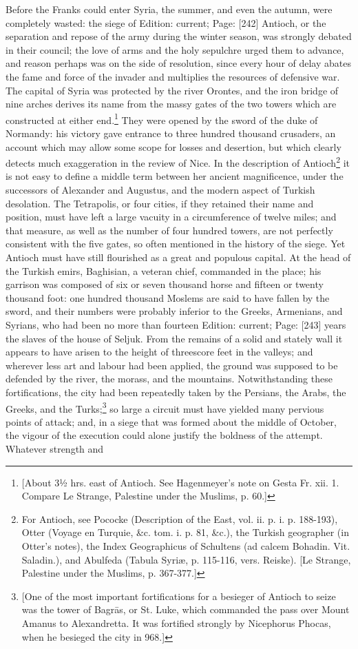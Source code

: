 Before the Franks could enter Syria, the summer, and even the autumn, were completely wasted: the siege of Edition: current; Page: [242] Antioch, or the separation and repose of the army during the winter season, was strongly debated in their council; the love of arms and the holy sepulchre urged them to advance, and reason perhaps was on the side of resolution, since every hour of delay abates the fame and force of the invader and multiplies the resources of defensive war. The capital of Syria was protected by the river Orontes, and the iron bridge of nine arches derives its name from the massy gates of the two towers which are constructed at either end.\footnote{[About 3½ hrs. east of Antioch. See Hagenmeyer\texthebrew{}’s note on Gesta Fr. xii. 1. Compare Le Strange, Palestine under the Muslims, p. 60.]} They were opened by the sword of the duke of Normandy: his victory gave entrance to three hundred thousand crusaders, an account which may allow some scope for losses and desertion, but which clearly detects much exaggeration in the review of Nice. In the description of Antioch\footnote{For Antioch, see Pococke (Description of the East, vol. ii. p. i. p. 188-193), Otter (Voyage en Turquie, \&c. tom. i. p. 81, \&c.), the Turkish geographer (in Otter\texthebrew{}’s notes), the Index Geographicus of Schultens (ad calcem Bohadin. Vit. Saladin.), and Abulfeda (Tabula Syriæ, p. 115-116, vers. Reiske). [Le Strange, Palestine under the Muslims, p. 367-377.]} it is not easy to define a middle term between her ancient magnificence, under the successors of Alexander and Augustus, and the modern aspect of Turkish desolation. The Tetrapolis, or four cities, if they retained their name and position, must have left a large vacuity in a circumference of twelve miles; and that measure, as well as the number of four hundred towers, are not perfectly consistent with the five gates, so often mentioned in the history of the siege. Yet Antioch must have still flourished as a great and populous capital. At the head of the Turkish emirs, Baghisian, a veteran chief, commanded in the place; his garrison was composed of six or seven thousand horse and fifteen or twenty thousand foot: one hundred thousand Moslems are said to have fallen by the sword, and their numbers were probably inferior to the Greeks, Armenians, and Syrians, who had been no more than fourteen Edition: current; Page: [243] years the slaves of the house of Seljuk. From the remains of a solid and stately wall it appears to have arisen to the height of threescore feet in the valleys; and wherever less art and labour had been applied, the ground was supposed to be defended by the river, the morass, and the mountains. Notwithstanding these fortifications, the city had been repeatedly taken by the Persians, the Arabs, the Greeks, and the Turks;\footnote{[One of the most important fortifications for a besieger of Antioch to seize was the tower of Bagrās, or St. Luke, which commanded the pass over Mount Amanus to Alexandretta. It was fortified strongly by Nicephorus Phocas, when he besieged the city in 968.]} so large a circuit must have yielded many pervious points of attack; and, in a siege that was formed about the middle of October, the vigour of the execution could alone justify the boldness of the attempt. Whatever strength and 